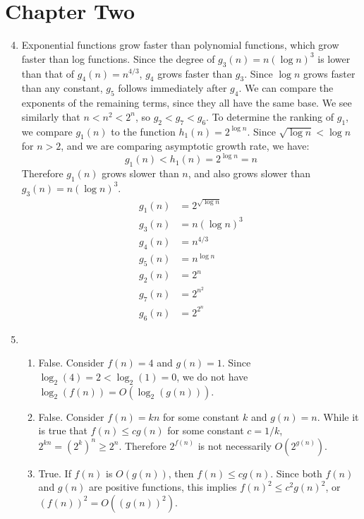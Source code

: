 \documentclass[oneside, 12pt]{article}
\begin{document}
\section*{Chapter Two}
\begin{enumerate}
\setcounter{enumi}{3}
\item
Exponential functions grow faster than polynomial functions, which grow faster than log functions. Since the degree of $g_3(n) = n(\log n)^3$ is lower than that of $g_4(n) = n^{4/3}$, $g_4$ grows faster than $g_3$. Since $\log n$ grows faster than any constant, $g_5$ follows immediately after $g_4$. We can compare the exponents of the remaining terms, since they all have the same base. We see similarly that $n < n^2 < 2^n$, so $g_2 < g_7 < g_6$. To determine the ranking of $g_1$, we compare $g_1(n)$ to the function $h_1(n) = 2^{\log n}$. Since $\sqrt{\log n} < \log n$ for $n > 2$, and we are comparing asymptotic growth rate, we have:
$$ g_1(n) < h_1(n) = 2^{\log n} = n $$
Therefore $g_1(n)$ grows slower than $n$, and also grows slower than $g_3(n) = n (\log n)^3 $. \begin{equation*}
\begin{split}
g_1(n) &= 2^{\sqrt{\log n}} \\
g_3(n) &= n (\log n)^3 \\
g_4(n) &= n^{4/3} \\
g_5(n) &= n^{\log n} \\
g_2(n) &= 2^n \\
g_7(n) &= 2^{n^2} \\
g_6(n) &= 2^{2^n}
\end{split}
\end{equation*}
\clearpage
\item
\begin{enumerate}
\item
False. Consider $f(n) = 4$ and $g(n) = 1$. Since $\log_2(4) = 2 < \log_2(1) = 0$, we do not have $\log_2(f(n)) = O(\log_2(g(n)))$. 
\item
False. Consider $f(n) = kn$ for some constant $k$ and $g(n) = n$. While it is true that $f(n) \le c g(n)$ for some constant $c = 1/k$, $2^{kn} = (2^k)^n \ge 2^n$. Therefore $2^{f(n)}$ is not necessarily $O(2^{g(n)})$.
\item 
True. If $f(n)$ is $O(g(n))$, then $f(n) \le c g(n)$. Since both $f(n)$ and $g(n)$ are positive functions, this implies $f(n)^2 \le c^2 g(n)^2$, or $(f(n))^2 = O((g(n))^2)$. 
\end{enumerate}
\end{enumerate}
\end{document}
